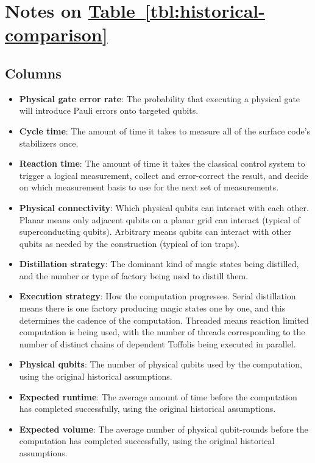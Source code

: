 \documentclass[superscriptaddress,notitlepage,longbibliography]{revtex4-1}
\theoremstyle{definition}
\theoremstyle{definition}
\newcommand{\tbl}[1]{\hyperref[tbl:#1]{Table~\ref*{tbl:#1}}}
\begin{document}
\section{Notes on \texorpdfstring{\tbl{historical-comparison}}{Table II}}
\label{app:historical-table-details}

\subsection{Columns}

\begin{itemize}
    \item \textbf{Physical gate error rate}:
        The probability that executing a physical gate will introduce Pauli errors onto targeted qubits.
    \item \textbf{Cycle time}:
        The amount of time it takes to measure all of the surface code's stabilizers once.
    \item \textbf{Reaction time}:
        The amount of time it takes the classical control system to trigger a logical measurement, collect and error-correct the result, and decide on which measurement basis to use for the next set of measurements.
    \item \textbf{Physical connectivity}:
        Which physical qubits can interact with each other.
        Planar means only adjacent qubits on a planar grid can interact (typical of superconducting qubits).
        Arbitrary means qubits can interact with other qubits as needed by the construction (typical of ion traps).
    \item \textbf{Distillation strategy}:
        The dominant kind of magic states being distilled, and the number or type of factory being used to distill them.
    \item \textbf{Execution strategy}:
        How the computation progresses.
        Serial distillation means there is one factory producing magic states one by one, and this determines the cadence of the computation.
        Threaded means reaction limited computation is being used, with the number of threads corresponding to the number of distinct chains of dependent Toffolis being executed in parallel.
    \item \textbf{Physical qubits}:
        The number of physical qubits used by the computation, using the original historical assumptions.
    \item \textbf{Expected runtime}:
        The average amount of time before the computation has completed successfully, using the original historical assumptions.
    \item \textbf{Expected volume}:
        The average number of physical qubit-rounds before the computation has completed successfully, using the original historical assumptions.
\end{itemize}
\end{document}
